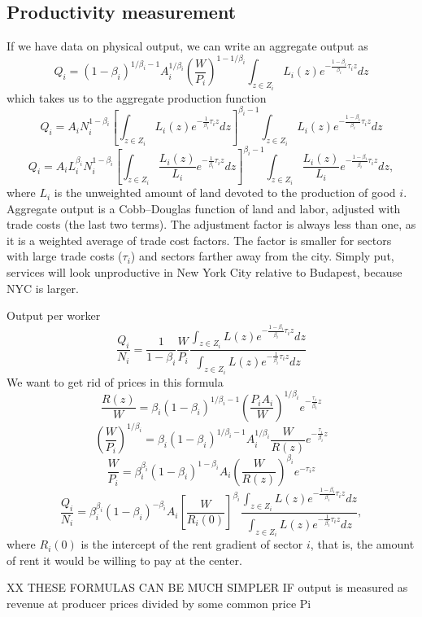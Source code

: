 \documentclass[12pt]{article}
\begin{document}
\subsection{Productivity measurement}
If we have data on physical output, we can write an aggregate output as
\[
Q_i = 
(1-\beta_i)^{1/\beta_i-1}
A_i^{1/\beta_i}\left(\frac{W}{P_i}\right)^{1-1/\beta_i}
\int_{z\in Z_i}L_i(z) e^{-\frac{1-\beta_i}{\beta_i}\tau_i z}dz
\]
which takes us to the aggregate production function
\[
Q_i = 
A_iN_i^{1-\beta_i}\left[\int_{z\in Z_i}L_i(z) e^{-\frac{1}{\beta_i}\tau_i z}dz\right]^{\beta_i-1}
\int_{z\in Z_i}L_i(z) e^{-\frac{1-\beta_i}{\beta_i}\tau_i z}dz
\]
\[
Q_i = 
A_iL_i^{\beta_i}N_i^{1-\beta_i}
\left[\int_{z\in Z_i}\frac{L_i(z)}{L_i} e^{-\frac{1}{\beta_i}\tau_i z}dz\right]^{\beta_i-1}
\int_{z\in Z_i}\frac{L_i(z)}{L_i} e^{-\frac{1-\beta_i}{\beta_i}\tau_i z}dz,
\]
where $L_i$ is the unweighted amount of land devoted to the production of good $i$. Aggregate output is a Cobb--Douglas function of land and labor, adjusted with trade costs (the last two terms). The adjustment factor is always less than one, as it is a weighted average of trade cost factors. The factor is smaller for sectors with large trade costs ($\tau_i$) and sectors farther away from the city. Simply put, services will look unproductive in New York City relative to Budapest, because NYC is larger.

Output per worker
\[
\frac{Q_i}{N_i} = \frac1{1-\beta_i}
\frac{W}{P_i} \frac{\int_{z\in Z_i}L(z)e^{-\frac{1-\beta_i}{\beta_i}\tau_i z}dz}
{\int_{z\in Z_i}L(z)e^{-\frac{1}{\beta_i}\tau_i z}dz}
\]
We want to get rid of prices in this formula
\[
\frac{R(z)}{W} =\beta_i(1-\beta_i)^{1/\beta_i-1} \left(\frac{P_iA_i}{W}\right)^{1/\beta_i} e^{-\frac{\tau_i}{\beta_i} z}
\]
\[
\left(\frac{W}{P_i}\right)^{1/\beta_i}  =\beta_i(1-\beta_i)^{1/\beta_i-1} 
A_i^{1/\beta_i}
\frac{W}{R(z)}
 e^{-\frac{\tau_i}{\beta_i} z}
\]
\[
\frac{W}{P_i}  =\beta_i^{\beta_i}(1-\beta_i)^{1-\beta_i} 
A_i
\left(\frac{W}{R(z)}\right)^{\beta_i}
 e^{-\tau_i  z}
\]
\[
\frac{Q_i}{N_i} = \beta_i^{\beta_i}(1-\beta_i)^{-\beta_i} 
A_i
\left[\frac{W}{R_i(0)}\right]^{\beta_i}
 \frac{\int_{z\in Z_i}L(z)e^{-\frac{1-\beta_i}{\beta_i}\tau_i z}dz}
{\int_{z\in Z_i}L(z)e^{-\frac{1}{\beta_i}\tau_i z}dz},
\]
where $R_i(0)$ is the intercept of the rent gradient of sector $i$, that is, the amount of rent it would be willing to pay at the center. 

XX THESE FORMULAS CAN BE MUCH SIMPLER IF output is measured as revenue at producer prices divided by some common price Pi
\end{document}
